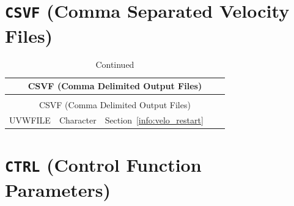 \documentclass[11pt]{book}
\begin{document}
\vspace{\baselineskip}


\section{\texorpdfstring{{\tt CSVF}}{CSVF} (Comma Separated Velocity Files)}

\begin{longtable}{@{\extracolsep{\fill}}|l|l|l|l|l|}
\caption[Comma separated velocity files ({\ct CSVF} namelist group)]{For more information see Section~\ref{info:CSVF}.}
\label{tbl:CSVF} \\
\hline
\multicolumn{5}{|c|}{{\ct CSVF} (Comma Delimited Output Files)} \\
\hline \hline
\endfirsthead
\caption[]{Continued} \\
\hline
\multicolumn{5}{|c|}{{\ct CSVF} (Comma Delimited Output Files)} \\
\hline \hline
\endhead
{\ct UVWFILE}         & Character      & Section~\ref{info:velo_restart}      &            &     \\ \hline
\end{longtable}

\vspace{\baselineskip}



\section{\texorpdfstring{{\tt CTRL}}{CTRL} (Control Function Parameters)}
\end{document}
